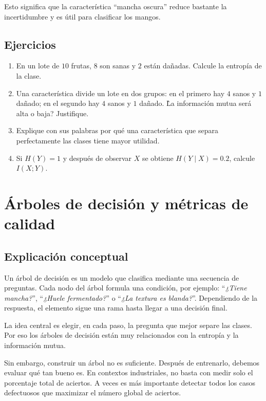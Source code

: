 \documentclass[12pt]{article}
\begin{document}
Esto significa que la característica ``mancha oscura'' reduce bastante la incertidumbre y es útil para clasificar los mangos.

\subsection{Ejercicios}
\begin{enumerate}[label=\arabic*.]
    \item En un lote de \(10\) frutas, \(8\) son sanas y \(2\) están dañadas. Calcule la entropía de la clase.
    \item Una característica divide un lote en dos grupos: en el primero hay \(4\) sanos y \(1\) dañado; en el segundo hay \(4\) sanos y \(1\) dañado. \`La información mutua será alta o baja? Justifique.
    \item Explique con sus palabras por qué una característica que separa perfectamente las clases tiene mayor utilidad.
    \item Si \(H(Y)=1\) y después de observar \(X\) se obtiene \(H(Y \mid X)=0.2\), calcule \(I(X;Y)\).
\end{enumerate}


\section{Árboles de decisión y métricas de calidad}

\subsection{Explicación conceptual}
Un árbol de decisión es un modelo que clasifica mediante una secuencia de preguntas.
Cada nodo del árbol formula una condición, por ejemplo: ``\textit{¿Tiene mancha?}'', ``\textit{¿Huele fermentado?}'' o ``\textit{¿La textura es blanda?}''.
Dependiendo de la respuesta, el elemento sigue una rama hasta llegar a una decisión final.

La idea central es elegir, en cada paso, la pregunta que mejor separe las clases.
Por eso los árboles de decisión están muy relacionados con la entropía y la información mutua.

Sin embargo, construir un árbol no es suficiente.
Después de entrenarlo, debemos evaluar qué tan bueno es.
En contextos industriales, no basta con medir solo el porcentaje total de aciertos.
A veces es más importante detectar todos los casos defectuosos que maximizar el número global de aciertos.
\end{document}
